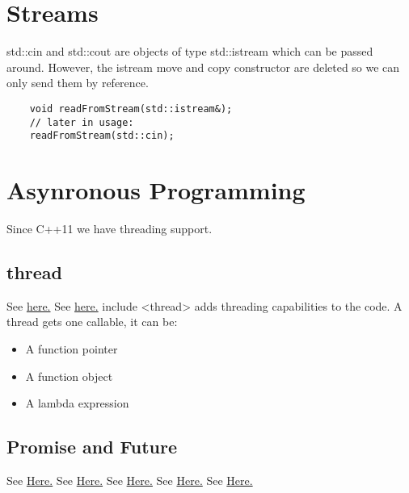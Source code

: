 \documentclass[11pt,twoside,a4paper]{report}
\begin{document}
\chapter{Streams}
std::cin and std::cout are objects of type std::istream which can be passed around. However, the istream move and copy constructor are deleted so we can only send them by reference.

\begin{lstlisting}
    void readFromStream(std::istream&);
    // later in usage:
    readFromStream(std::cin);
\end{lstlisting}

\chapter{Asynronous Programming}
Since C++11 we have threading support.
\section{thread}
See \href{https://www.geeksforgeeks.org/multithreading-in-cpp/}{here.}
See \href{https://www.bogotobogo.com/cplusplus/C11/1_C11_creating_thread.php}{here.}
include <thread> adds threading capabilities to the code. A thread gets one callable, it can be:
\begin{itemize}
    \item A function pointer
    \item A function object
    \item A lambda expression
\end{itemize}

\section{Promise and Future}
See \href{https://www.modernescpp.com/index.php/promise-and-future}{Here.}
See \href{https://en.cppreference.com/w/cpp/thread/future}{Here.}
See \href{https://stackoverflow.com/questions/7686939/c-simple-return-value-from-stdthread}{Here.}
See \href{https://www.youtube.com/watch?v=XDZkyQVsbDY}{Here.}
See \href{https://www.youtube.com/watch?v=o0pCft99K74&list=PL1835A90FC78FF8BE&index=4}{Here.}
\end{document}
